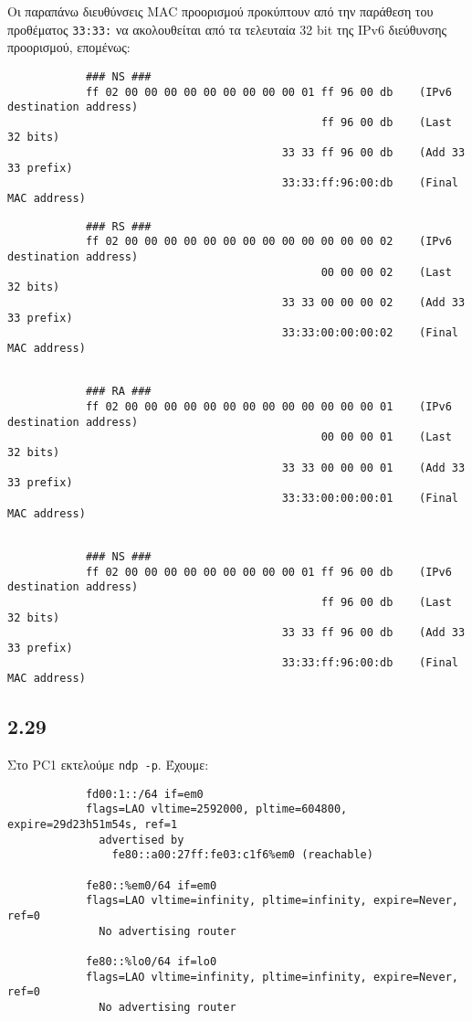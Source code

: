 \documentclass[a4paper, 12pt]{article}
\begin{document}
		Οι παραπάνω διευθύνσεις MAC προορισμού προκύπτουν από την παράθεση του προθέματος \verb|33:33:| να ακολουθείται από τα τελευταία 32 bit της IPv6 διεύθυνσης προορισμού, επομένως:
		
		\begin{verbatim} 
			### NS ###
			ff 02 00 00 00 00 00 00 00 00 00 01 ff 96 00 db    (IPv6 destination address)
			                                    ff 96 00 db    (Last 32 bits)
			                              33 33 ff 96 00 db    (Add 33 33 prefix)			
			                              33:33:ff:96:00:db    (Final MAC address)
		\end{verbatim}
		
		\begin{verbatim} 
			### RS ###
			ff 02 00 00 00 00 00 00 00 00 00 00 00 00 00 02    (IPv6 destination address)
			                                    00 00 00 02    (Last 32 bits)
			                              33 33 00 00 00 02    (Add 33 33 prefix)
			                              33:33:00:00:00:02    (Final MAC address)
		\end{verbatim}
	
		\begin{verbatim} 
	
			### RA ###
			ff 02 00 00 00 00 00 00 00 00 00 00 00 00 00 01    (IPv6 destination address)
			                                    00 00 00 01    (Last 32 bits)
			                              33 33 00 00 00 01    (Add 33 33 prefix)
			                              33:33:00:00:00:01    (Final MAC address)
	
		\end{verbatim}
		
		\begin{verbatim} 
			### NS ###
			ff 02 00 00 00 00 00 00 00 00 00 01 ff 96 00 db    (IPv6 destination address)
			                                    ff 96 00 db    (Last 32 bits)
			                              33 33 ff 96 00 db    (Add 33 33 prefix)
			                              33:33:ff:96:00:db    (Final MAC address)	
		\end{verbatim}

	\subsection*{2.29}
		Στο PC1 εκτελούμε \verb|ndp -p|. Έχουμε:
		
		\begin{verbatim}
			fd00:1::/64 if=em0
			flags=LAO vltime=2592000, pltime=604800, expire=29d23h51m54s, ref=1
			  advertised by
			    fe80::a00:27ff:fe03:c1f6%em0 (reachable)
			
			fe80::%em0/64 if=em0
			flags=LAO vltime=infinity, pltime=infinity, expire=Never, ref=0
			  No advertising router
			
			fe80::%lo0/64 if=lo0
			flags=LAO vltime=infinity, pltime=infinity, expire=Never, ref=0
			  No advertising router
		\end{verbatim}
		
\end{document}
